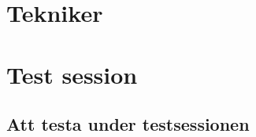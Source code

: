 
\appendix
\chapter{Tekniker}


\appendix
\chapter{Test session}

\section{Att testa under testsessionen}
